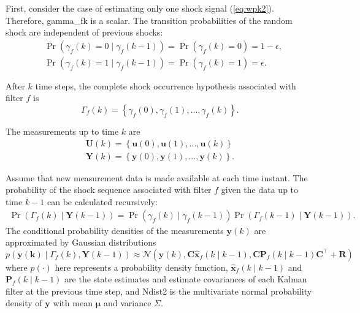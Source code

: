 First, consider the case of estimating only one shock signal (\ref{eq:wpk2}). Therefore, \gls{gamma_fk} is a scalar. The transition probabilities of the random shock are independent of previous shocks:
\begin{equation} \label{eq:Pr_gammak_given_gammakm1}
	\begin{aligned}
		& \Pr\left(\gamma_{f}(k)=0 \mid \gamma_{f}(k-1)\right) = \Pr\left(\gamma_{f}(k)=0\right) = 1-\epsilon, \\
		& \Pr\left(\gamma_{f}(k)=1 \mid \gamma_{f}(k-1)\right) = \Pr\left(\gamma_{f}(k)=1\right) = \epsilon.
	\end{aligned}
\end{equation}

After $k$ time steps, the complete shock occurrence hypothesis associated with filter $f$ is
\begin{equation} \label{eq:Gammak}
	\Gamma_f(k) = \left\{ \gamma_f(0), \gamma_f(1), ..., \gamma_f(k) \right\}.
\end{equation}

The measurements up to time $k$ are
\begin{equation} \label{eq:Uk_Yk}
	\begin{aligned}
		\mathbf{U}(k) = \left\{ \mathbf{u}(0), \mathbf{u}(1), ..., \mathbf{u}(k) \right\} \\
		\mathbf{Y}(k) = \left\{ \mathbf{y}(0), \mathbf{y}(1), ..., \mathbf{y}(k) \right\}.
	\end{aligned}
\end{equation}

Assume that new measurement data is made available at each time instant. The probability of the shock sequence associated with filter $f$ given the data up to time $k-1$ can be calculated recursively:
\begin{multline} \label{eq:Pr_Gammakp1_given_Yk}
	\Pr(\Gamma_f(k) \mid \mathbf{Y}(k-1)) = 
	\Pr(\gamma_f(k) \mid \gamma_f(k-1)) \Pr(\Gamma_f(k-1) \mid \mathbf{Y}(k-1)).
\end{multline}
The conditional probability densities of the measurements $\mathbf{y}(k)$ are approximated by Gaussian distributions
\begin{equation} \label{eq:p_yk_given_Gammak_Ykm1}
	p(\mathbf{y(k)} \mid \Gamma_f(k), \mathbf{Y}(k-1)) \approx
	\mathcal{N}\left(\mathbf{y}(k), \mathbf{C} \mathbf{\hat{x}}_{f}(k \mid k-1), \mathbf{C} \mathbf{P}_f(k \mid k-1) \mathbf{C}^\intercal+\mathbf{R}\right)
\end{equation}
where $p(\cdot)$ here represents a probability density function, $\mathbf{\hat{x}}_{f}(k \mid k-1)$ and $\mathbf{P}_f(k \mid k-1)$ are the state estimates and estimate covariances of each Kalman filter at the previous time step, and \gls{Ndist2} is the multivariate normal probability density of $\mathbf{y}$ with mean $\mathbf{\mu}$ and variance $\Sigma$.

